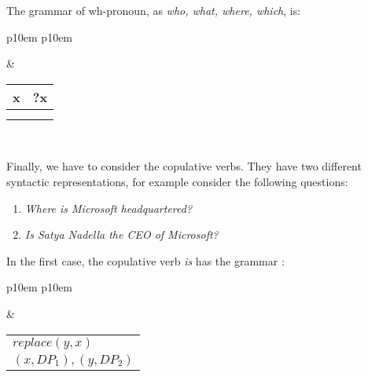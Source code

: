 The grammar of wh-pronoun, as \textit{who, what, where, which}, is:
\medskip
\begin{center}
\begin{tabular}{ p{10em} p{10em} }
	\label{tbl:grammar.who}
	
	\begin{center}
		\begin{tikzpicture}
		\Tree [.DP  [.PRN who ] ]
		\end{tikzpicture}
	\end{center}
		
	&

	\begin{center}
		\begin{tabular}{|c|l|}
			\hline
			x & ?x\\ 
			\hline
			\multicolumn{2}{|l|}{
				\mbox{}
			} \\
			\hline
			\multicolumn{2}{|l|}{
				\mbox{}
			} \\
			\hline
		\end{tabular}
	\end{center}	
	\\
\end{tabular}
\end{center}
\medskip

Finally, we have to consider the copulative verbs. They have two different syntactic representations, for example consider the following questions:
\begin{enumerate}
\item \textit{Where is Microsoft headquartered?}
\item \textit{Is Satya Nadella the CEO of Microsoft?}
\end{enumerate}
In the first case, the copulative verb \textit{is} has the grammar :
\medskip
\begin{center}
\begin{tabular}{ p{10em} p{10em} }
	\label{tbl:grammar.is}
	
	\begin{center}
		\begin{tikzpicture}
		\Tree [.S [.DP$_1\downarrow$ ] [.VP [.V is ] DP$_2\downarrow$ ] ]	
		\end{tikzpicture}
	\end{center}
	
	&

	\begin{center}
		\begin{tabular}{|c|l|}
			\hline
			\mbox{} & \mbox{}\\
			\hline
			\multicolumn{2}{|l|}{
				$replace(y,x)$
			} \\
			\hline
			\multicolumn{2}{|l|}{
				$(x,DP_{1}),(y,DP_{2})$
			} \\
			\hline
		\end{tabular}
	\end{center}	
	\\
\end{tabular}
\end{center}
\medskip

